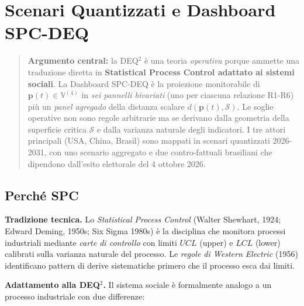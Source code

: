\chapter{Scenari Quantizzati e Dashboard
SPC-DEQ}\label{scenari-quantizzati-e-dashboard-spc-deq}

\begin{quote}
\textbf{Argumento central:} la DEQ$^2$ è una teoria \emph{operativa}
porque ammette una traduzione diretta in \textbf{Statistical Process
Control adattato ai sistemi sociali}. La Dashboard SPC-DEQ è la
proiezione monitorabile di \(\boldsymbol{p}(t) \in \mathbb{V}^{(4)}\) in
\emph{sei pannelli bivariati} (uno per ciascuna relazione R1-R6) più un
\emph{panel agregado} della distanza scalare
\(d(\boldsymbol{p}(t), \mathcal{S})\). Le soglie operative non sono
regole arbitrarie ma se derivano dalla geometria della superficie critica
\(\mathcal{S}\) e dalla varianza naturale degli indicatori. I tre attori
principali (USA, China, Brasil) sono mappati in scenari quantizzati
2026-2031, con uno scenario aggregato e due contro-fattuali brasiliani
che dipendono dall'esito elettorale del 4 ottobre 2026.
\end{quote}



\section{Perché SPC}\label{perchuxe9-spc}

\Hypoth{} \textbf{Tradizione tecnica.} Lo \emph{Statistical Process
Control} (Walter Shewhart, 1924; Edward Deming, 1950s; Six Sigma 1980s)
è la disciplina che monitora processi industriali mediante \emph{carte di
controllo} con limiti \(UCL\) (upper) e \(LCL\) (lower) calibrati sulla
varianza naturale del processo. Le \emph{regole di Western Electric}
(1956) identificano pattern di derive sistematiche primero che il processo
esca dai limiti.

\Hypoth{} \textbf{Adattamento alla DEQ$^2$.} Il sistema sociale è
formalmente analogo a un processo industriale con due differenze:

